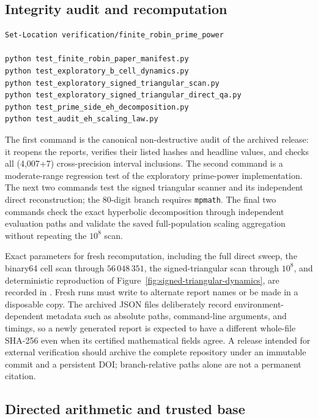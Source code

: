 \documentclass[11pt,a4paper]{article}
\numberwithin{equation}{section}
\theoremstyle{definition}
\newcommand{\Xdirect}{56\,048\,351}
\begin{document}
\subsection{Integrity audit and recomputation}

\begin{verbatim}
Set-Location verification/finite_robin_prime_power

python test_finite_robin_paper_manifest.py
python test_exploratory_b_cell_dynamics.py
python test_exploratory_signed_triangular_scan.py
python test_exploratory_signed_triangular_direct_qa.py
python test_prime_side_eh_decomposition.py
python test_audit_eh_scaling_law.py
\end{verbatim}

The first command is the canonical non-destructive audit of the archived
release: it reopens the reports, verifies their listed hashes and headline
values, and checks all (4,007+7) cross-precision interval inclusions.  The
second command is a moderate-range regression test of the exploratory
prime-power implementation.  The next two commands test the signed
triangular scanner and its independent direct reconstruction; the 80-digit
branch requires \texttt{mpmath}.  The final two commands check the exact
hyperbolic decomposition through independent evaluation paths and validate
the saved full-population scaling aggregation without repeating the
\(10^8\) scan.

Exact parameters for fresh recomputation, including the full direct sweep,
the binary64 cell scan through \(\Xdirect\), the signed-triangular scan
through \(10^8\), and deterministic reproduction of
Figure~\ref{fig:signed-triangular-dynamics}, are recorded in
.  Fresh runs must write
to alternate report names or be made in a disposable copy.  The archived JSON
files deliberately record environment-dependent metadata such as absolute
paths, command-line arguments, and timings, so a newly generated report is
expected to have a different whole-file SHA-256 even when its certified
mathematical fields agree.  A release intended for external verification
should archive the complete repository under an immutable commit and a
persistent DOI; branch-relative paths alone are not a permanent citation.

\subsection{Directed arithmetic and trusted base}
\end{document}
